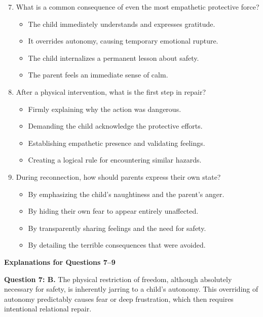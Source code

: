 \begin{practiceexercise}
\begin{enumerate}
  \setcounter{enumi}{6}
  \item What is a common consequence of even the most empathetic protective force?
    \begin{itemize}
      \item[A)] The child immediately understands and expresses gratitude.
      \item[B)] It overrides autonomy, causing temporary emotional rupture.
      \item[C)] The child internalizes a permanent lesson about safety.
      \item[D)] The parent feels an immediate sense of calm.
    \end{itemize}
  \item After a physical intervention, what is the first step in repair?
    \begin{itemize}
      \item[A)] Firmly explaining why the action was dangerous.
      \item[B)] Demanding the child acknowledge the protective efforts.
      \item[C)] Establishing empathetic presence and validating feelings.
      \item[D)] Creating a logical rule for encountering similar hazards.
    \end{itemize}
  \item During reconnection, how should parents express their own state?
    \begin{itemize}
      \item[A)] By emphasizing the child's naughtiness and the parent's anger.
      \item[B)] By hiding their own fear to appear entirely unaffected.
      \item[C)] By transparently sharing feelings and the need for safety.
      \item[D)] By detailing the terrible consequences that were avoided.
    \end{itemize}
\end{enumerate}

\newpage
\textbf{Explanations for Questions 7--9}

\textbf{Question 7: B.} The physical restriction of freedom, although absolutely necessary for safety, is inherently jarring to a child's autonomy.
This overriding of autonomy predictably causes fear or deep frustration, which then requires intentional relational repair.
\vspace{\fill}


\end{practiceexercise}
